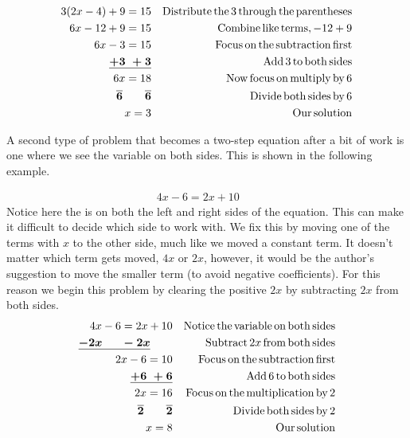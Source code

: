 \begin{example}\label{Lin20}
  
  \begin{eqnarray*}
    3 (2 x - 4) + 9 = 15 &  & \operatorname{Distribute} \operatorname{the} 3 \operatorname{through}
    \operatorname{the} \operatorname{parentheses}\\
    6 x - 12 + 9 = 15 &  & \operatorname{Combine} \operatorname{like} \operatorname{terms}, - 12 + 9\\
    6 x - 3 = 15 &  & \operatorname{Focus} \operatorname{on} \operatorname{the} \operatorname{subtraction}
    \operatorname{first}\\
    \boldsymbol{\underline{+ 3 ~+ 3}} &  & \operatorname{Add} 3 \operatorname{to} \operatorname{both} \operatorname{sides}\\
    6 x = 18 &  & \operatorname{Now} \operatorname{focus} \operatorname{on} \operatorname{multiply} \operatorname{by}
    6\\
    \boldsymbol{\overline{6} ~~~~~~ \overline{6}} &  & \operatorname{Divide} \operatorname{both} \operatorname{sides}
    \operatorname{by} 6\\
    x = 3 &  & \operatorname{Our} \operatorname{solution}
  \end{eqnarray*}
\end{example}

 A second type of problem that becomes a two-step equation after a bit of work
is one where we see the variable on both sides. This is shown in the following
example.

\begin{example}\label{Lin21}
  
  \begin{eqnarray*}
    4 x - 6 = 2 x + 10 &  & 
  \end{eqnarray*}
   Notice here the {} is on both the left and right sides of the
  equation. This can make it difficult to decide which side to work with. We
  fix this by moving one of the terms with $x$ to the other side, much like we
  moved a constant term. It doesn't matter which term gets moved, $4 x$ or $2
  x$, however, it would be the author's suggestion to move the smaller term
  (to avoid negative coefficients). For this reason we begin this problem by
  clearing the positive $2 x$ by subtracting $2 x$ from both sides.
  \begin{eqnarray*}
    4 x - 6 = 2 x + 10 &  & \operatorname{Notice} \operatorname{the} \operatorname{variable} \operatorname{on}
    \operatorname{both} \operatorname{sides}\\
    \boldsymbol{\underline{- 2 x ~~~~~- 2 x}}~~~~~~  &  & \operatorname{Subtract} 2 x \operatorname{from}
    \operatorname{both} \operatorname{sides}\\
    2 x - 6 = 10 &  & \operatorname{Focus} \operatorname{on} \operatorname{the} \operatorname{subtraction}
    \operatorname{first}\\
    \boldsymbol{\underline{+ 6 ~+ 6}}  &  & \operatorname{Add} 6 \operatorname{to} \operatorname{both}
    \operatorname{sides}\\
    2 x = 16 &  & \operatorname{Focus} \operatorname{on} \operatorname{the} \operatorname{multiplication}
    \operatorname{by} 2\\
    \boldsymbol{\overline{2} ~~~~~~ \overline{2} } &  & \operatorname{Divide} \operatorname{both}
    \operatorname{sides} \operatorname{by} 2\\
    x = 8 &  & \operatorname{Our} \operatorname{solution}
  \end{eqnarray*}
\end{example}

